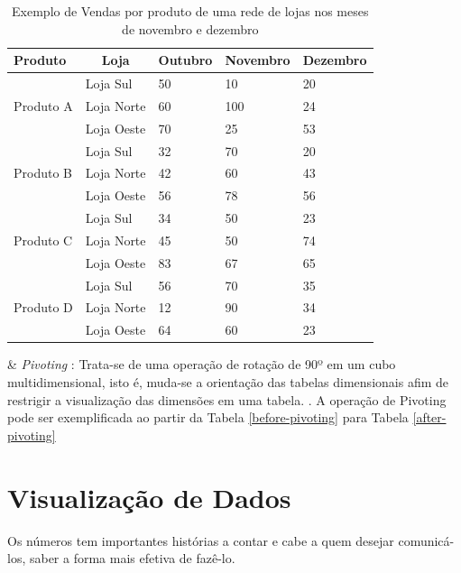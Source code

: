 \begin{table}[ht]
\centering
\begin{tabular}{|l|l|l|l|l|}
\hline
Produto                                          & \multicolumn{1}{|c|}{Loja} & Outubro & Novembro & Dezembro \\ \hline

\multicolumn{1}{|c|}{\multirow{3}{*}{Produto A}} & Loja Sul                   & 50      & 10       & 20       \\ \cline{2-5} 
& Loja Norte                 & 60      & 100      & 24       \\ \cline{2-5} 
& Loja Oeste                 & 70      & 25       & 53       \\ \hline

\multirow{3}{*}{Produto B}                       & Loja Sul                   & 32      & 70       & 20       \\ \cline{2-5} 
& Loja Norte                 & 42      & 60       & 43       \\ \cline{2-5}

& Loja Oeste                 & 56      & 78       & 56       \\ \hline


\multirow{3}{*}{Produto C}                       & Loja Sul                   & 34      & 50       & 23       \\ \cline{2-5} 
& Loja Norte                 & 45      & 50       & 74       \\ \cline{2-5} 
& Loja Oeste                 & 83      & 67       & 65       \\ \hline


\multirow{3}{*}{Produto D}                       & Loja Sul                   & 56      & 70       & 35       \\ \cline{2-5} 
& Loja Norte                 & 12      & 90       & 34       \\ \cline{2-5} 
& Loja Oeste                 & 64      & 60       & 23       \\ \hline

\end{tabular}
\caption{Exemplo de Vendas por produto de uma rede de lojas nos meses de novembro e dezembro}
\label{before-slice}
\end{table}


\begin{easylist}[itemize]

& \textit{Pivoting} : Trata-se de uma operação de rotação de 90º em um cubo multidimensional, isto é, muda-se a orientação das tabelas dimensionais afim de restrigir a visualização das dimensões em uma tabela. \cite{andre2000}. A operação de Pivoting pode ser exemplificada ao partir da Tabela \ref{before-pivoting} para Tabela \ref{after-pivoting}


\end{easylist}




\section {Visualização de Dados}

Os números tem importantes histórias a contar e cabe a quem desejar comunicá-los, saber a forma mais efetiva de fazê-lo.
